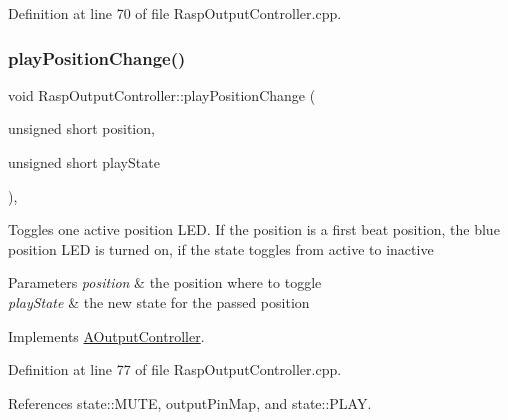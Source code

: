 Definition at line 70 of file Rasp\+Output\+Controller.\+cpp.

\mbox{\label{class_rasp_output_controller_a0778395ee8ec044d04fbfcb2f3b2eb04}} 
\subsubsection{\texorpdfstring{play\+Position\+Change()}{playPositionChange()}\hspace{0.1cm}{\footnotesize\ttfamily [2/2]}}
{\footnotesize\ttfamily void Rasp\+Output\+Controller\+::play\+Position\+Change (\begin{DoxyParamCaption}\item[{unsigned short}]{position,  }\item[{unsigned short}]{play\+State }\end{DoxyParamCaption})\hspace{0.3cm}{\ttfamily [override]}, {\ttfamily [virtual]}}

Toggles one active position L\+ED. If the position is a first beat position, the blue position L\+ED is turned on, if the state toggles from active to inactive 
\begin{DoxyParams}{Parameters}
{\em position} & the position where to toggle \\
\hline
{\em play\+State} & the new state for the passed position \\
\hline
\end{DoxyParams}


Implements \hyperlink{class_a_output_controller_a15c1300df5606bf7d4838b41a45c31e3}{A\+Output\+Controller}.



Definition at line 77 of file Rasp\+Output\+Controller.\+cpp.



References state\+::\+M\+U\+TE, output\+Pin\+Map, and state\+::\+P\+L\+AY.

\mbox{\label{class_rasp_output_controller_afce87d510c0564567e4250b22639d5e0}} 
